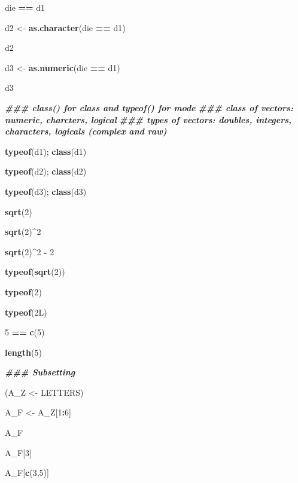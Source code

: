 \documentclass[
  xelatex, ja=standard]{bxjsbook}
\newenvironment{Shaded}{\begin{snugshade}}{\end{snugshade}}
\newcommand{\DecValTok}[1]{\textcolor[rgb]{0.00,0.00,0.81}{#1}}
\newcommand{\DocumentationTok}[1]{\textcolor[rgb]{0.56,0.35,0.01}{\textbf{\textit{#1}}}}
\newcommand{\FunctionTok}[1]{\textcolor[rgb]{0.13,0.29,0.53}{\textbf{#1}}}
\newcommand{\NormalTok}[1]{#1}
\newcommand{\OtherTok}[1]{\textcolor[rgb]{0.56,0.35,0.01}{#1}}
\newcommand{\SpecialCharTok}[1]{\textcolor[rgb]{0.81,0.36,0.00}{\textbf{#1}}}
\theoremstyle{definition}
\theoremstyle{definition}
\theoremstyle{definition}
\theoremstyle{definition}
\theoremstyle{remark}
\begin{document}
\begin{Shaded}
\begin{Highlighting}[]
\NormalTok{die }\SpecialCharTok{==}\NormalTok{ d1}

\NormalTok{d2 }\OtherTok{\textless{}{-}} \FunctionTok{as.character}\NormalTok{(die }\SpecialCharTok{==}\NormalTok{ d1)}

\NormalTok{d2}

\NormalTok{d3 }\OtherTok{\textless{}{-}} \FunctionTok{as.numeric}\NormalTok{(die }\SpecialCharTok{==}\NormalTok{ d1)}

\NormalTok{d3}

\DocumentationTok{\#\#\# class() for class and typeof() for mode}
\DocumentationTok{\#\#\# class of vectors: numeric, charcters, logical}
\DocumentationTok{\#\#\# types of vectors: doubles, integers, characters, logicals (complex and raw)}

\FunctionTok{typeof}\NormalTok{(d1); }\FunctionTok{class}\NormalTok{(d1)}

\FunctionTok{typeof}\NormalTok{(d2); }\FunctionTok{class}\NormalTok{(d2)}

\FunctionTok{typeof}\NormalTok{(d3); }\FunctionTok{class}\NormalTok{(d3)}

\FunctionTok{sqrt}\NormalTok{(}\DecValTok{2}\NormalTok{)}

\FunctionTok{sqrt}\NormalTok{(}\DecValTok{2}\NormalTok{)}\SpecialCharTok{\^{}}\DecValTok{2}

\FunctionTok{sqrt}\NormalTok{(}\DecValTok{2}\NormalTok{)}\SpecialCharTok{\^{}}\DecValTok{2} \SpecialCharTok{{-}} \DecValTok{2}

\FunctionTok{typeof}\NormalTok{(}\FunctionTok{sqrt}\NormalTok{(}\DecValTok{2}\NormalTok{))}

\FunctionTok{typeof}\NormalTok{(}\DecValTok{2}\NormalTok{)}

\FunctionTok{typeof}\NormalTok{(2L)}

\DecValTok{5} \SpecialCharTok{==} \FunctionTok{c}\NormalTok{(}\DecValTok{5}\NormalTok{)}

\FunctionTok{length}\NormalTok{(}\DecValTok{5}\NormalTok{)}

\DocumentationTok{\#\#\# Subsetting}

\NormalTok{(A\_Z }\OtherTok{\textless{}{-}}\NormalTok{ LETTERS)}

\NormalTok{A\_F }\OtherTok{\textless{}{-}}\NormalTok{ A\_Z[}\DecValTok{1}\SpecialCharTok{:}\DecValTok{6}\NormalTok{]}

\NormalTok{A\_F}

\NormalTok{A\_F[}\DecValTok{3}\NormalTok{]}

\NormalTok{A\_F[}\FunctionTok{c}\NormalTok{(}\DecValTok{3}\NormalTok{,}\DecValTok{5}\NormalTok{)]}


\end{Highlighting}
\end{Shaded}
\end{document}

